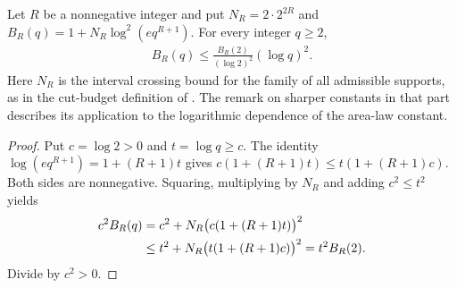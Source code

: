 \begin{lemma}
    \label{thm:chain_budget_log_sq}
    \leanok
    Let $R$ be a nonnegative integer and put $N_R=2\cdot2^{2R}$ and
    $B_R(q)=1+N_R\log^2(e q^{R+1})$. For every integer $q\ge2$,
    \begin{align}
        B_R(q)\le\frac{B_R(2)}{(\log2)^2}(\log q)^2.
    \end{align}
    Here $N_R$ is the interval crossing bound for the
    family of all admissible supports, as in the cut-budget definition of
    \cite[Part~I]{TNLean2026OneDimensional}.
    The remark on sharper constants in that part describes its application
    to the logarithmic dependence of the area-law constant.
\end{lemma}
\begin{proof}
    \leanok
    Put $c=\log2>0$ and $t=\log q\ge c$. The identity
    $\log(e q^{R+1})=1+(R+1)t$ gives
    $c(1+(R+1)t)\le t(1+(R+1)c)$.
    Both sides are nonnegative. Squaring, multiplying by $N_R$ and adding
    $c^2\le t^2$ yields
    \begin{align}
        c^2 B_R(q)
         & =c^2+N_R\bigl(c(1+(R+1)t)\bigr)^2 \notag \\
         & \le t^2+N_R\bigl(t(1+(R+1)c)\bigr)^2
        =t^2 B_R(2). \notag
    \end{align}
    Divide by $c^2>0$.
\end{proof}

